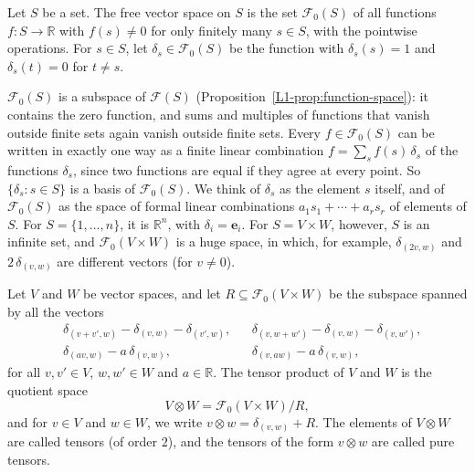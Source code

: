 \begin{definition}\label{L1-def:free}
    Let $S$ be a set. The free vector space on $S$ is the set $\mathcal{F}_0(S)$ of all functions $f: S \to \mathbb{R}$ with $f(s) \neq 0$ for only finitely many $s \in S$, with the pointwise operations. For $s \in S$, let $\delta_s \in \mathcal{F}_0(S)$ be the function with $\delta_s(s) = 1$ and $\delta_s(t) = 0$ for $t \neq s$.
\end{definition}

$\mathcal{F}_0(S)$ is a subspace of $\mathcal{F}(S)$ (Proposition~\ref{L1-prop:function-space}): it contains the zero function, and sums and multiples of functions that vanish outside finite sets again vanish outside finite sets. Every $f \in \mathcal{F}_0(S)$ can be written in exactly one way as a finite linear combination $f = \sum_s f(s)\,\delta_s$ of the functions $\delta_s$, since two functions are equal if they agree at every point. So $\{\delta_s : s \in S\}$ is a basis of $\mathcal{F}_0(S)$. We think of $\delta_s$ as the element $s$ itself, and of $\mathcal{F}_0(S)$ as the space of formal linear combinations $a_1s_1 + \cdots + a_rs_r$ of elements of $S$. For $S = \{1, \ldots, n\}$, it is $\mathbb{R}^n$, with $\delta_i = \mathbf{e}_i$. For $S = V \times W$, however, $S$ is an infinite set, and $\mathcal{F}_0(V \times W)$ is a huge space, in which, for example, $\delta_{(2v, w)}$ and $2\,\delta_{(v, w)}$ are different vectors (for $v \neq 0$).

\begin{definition}\label{L1-def:tensor-product}
    Let $V$ and $W$ be vector spaces, and let $R \subseteq \mathcal{F}_0(V \times W)$ be the subspace spanned by all the vectors
    \begin{align*}
        &\delta_{(v + v', w)} - \delta_{(v, w)} - \delta_{(v', w)}, && \delta_{(v, w + w')} - \delta_{(v, w)} - \delta_{(v, w')}, \\
        &\delta_{(av, w)} - a\,\delta_{(v, w)}, && \delta_{(v, aw)} - a\,\delta_{(v, w)},
    \end{align*}
    for all $v, v' \in V$, $w, w' \in W$ and $a \in \mathbb{R}$. The tensor product of $V$ and $W$ is the quotient space
    \[V \otimes W = \mathcal{F}_0(V \times W)/R,\]
    and for $v \in V$ and $w \in W$, we write $v \otimes w = \delta_{(v, w)} + R$. The elements of $V \otimes W$ are called tensors (of order $2$), and the tensors of the form $v \otimes w$ are called pure tensors.
\end{definition}

